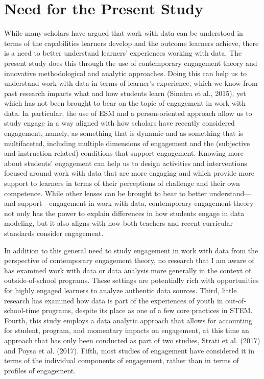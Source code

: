 \documentclass[]{book}
\theoremstyle{definition}
\theoremstyle{definition}
\theoremstyle{definition}
\theoremstyle{remark}
\begin{document}
\section{Need for the Present Study}\label{need-for-the-present-study}

While many scholars have argued that work with data can be understood in
terms of the capabilities learners develop and the outcome learners
achieve, there is a need to better understand learners' experiences
working with data. The present study does this through the use of
contemporary engagement theory and innovative methodological and
analytic approaches. Doing this can help us to understand work with data
in terms of learner's experience, which we know from past research
impacts what and how students learn (Sinatra et al., 2015), yet which
has not been brought to bear on the topic of engagement in work with
data. In particular, the use of ESM and a person-oriented approach allow
us to study engage in a way aligned with how scholars have recently
considered engagement, namely, as something that is dynamic and as
something that is multifaceted, including multiple dimensions of
engagement and the (subjective and instruction-related) conditions that
support engagement. Knowing more about students' engagement can help us
to design activities and interventions focused around work with data
that are more engaging and which provide more support to learners in
terms of their perceptions of challenge and their own competence. While
other lenses can be brought to bear to better understand---and
support---engagement in work with data, contemporary engagement theory
not only has the power to explain differences in how students engage in
data modeling, but it also aligns with how both teachers and recent
curricular standards consider engagement.

In addition to this general need to study engagement in work with data
from the perspective of contemporary engagement theory, no research that
I am aware of has examined work with data or data analysis more
generally in the context of outside-of-school programs. These settings
are potentially rich with opportunities for highly engaged learners to
analyze authentic data sources. Third, little research has examined how
data is part of the experiences of youth in out-of-school-time programs,
despite its place as one of a few core practices in STEM. Fourth, this
study employs a data analytic approach that allows for accounting for
student, program, and momentary impacts on engagement, at this time an
approach that has only been conducted as part of two studies, Strati et
al. (2017) and Poysa et al. (2017). Fifth, most studies of engagement
have considered it in terms of the individual components of engagement,
rather than in terms of profiles of engagement.
\end{document}
